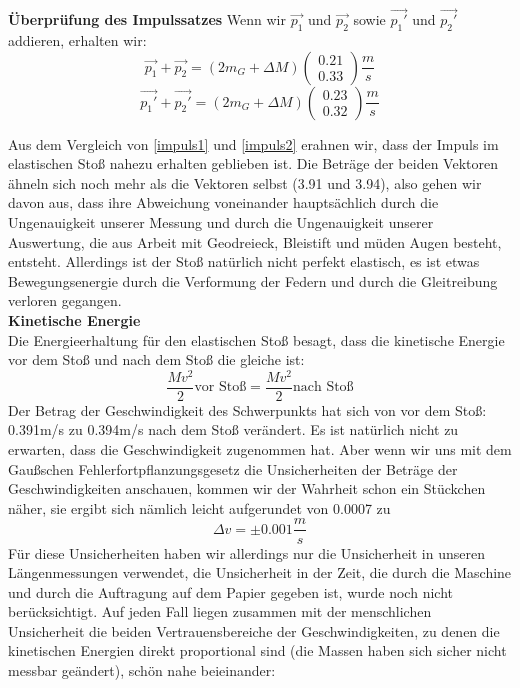 \documentclass{article}
\begin{document}
\textbf{Überprüfung des Impulssatzes}
Wenn wir $\vec{p_1}$ und $\vec{p_2}$ sowie $\vec{p_1'}$ und $\vec{p_2'}$ addieren, erhalten wir:
\begin{equation}\label{impuls1}
\vec{p_1}+\vec{p_2}=(2m_G+\Delta M )\begin{pmatrix}
0.21 \\ 0.33 
\end{pmatrix} \frac{m}{s}
\end{equation}
\begin{equation}\label{impuls2}
\vec{p_1'} + \vec{p_2'} =(2m_G +\Delta M )\begin{pmatrix}
0.23 \\
0.32
\end{pmatrix}  \frac{m}{s}
\end{equation}

Aus dem Vergleich von \ref{impuls1} und \ref{impuls2} erahnen wir, dass der Impuls im elastischen Stoß nahezu erhalten geblieben ist. Die Beträge der beiden Vektoren ähneln sich noch mehr als die Vektoren selbst (3.91 und 3.94), also gehen wir davon aus, dass ihre Abweichung voneinander hauptsächlich durch die Ungenauigkeit unserer Messung und durch die Ungenauigkeit unserer Auswertung, die aus Arbeit mit Geodreieck, Bleistift und müden Augen besteht, entsteht. Allerdings ist der Stoß natürlich nicht perfekt elastisch, es ist etwas Bewegungsenergie durch die Verformung der Federn und durch die Gleitreibung verloren gegangen. \\
\textbf{Kinetische Energie}\\
Die Energieerhaltung für den elastischen Stoß besagt, dass die kinetische Energie vor dem Stoß und nach dem Stoß die gleiche ist:
\begin{equation}
\frac{Mv^2}{2} \text{vor Stoß} = \frac{Mv^2}{2}  \text{nach Stoß} 
\end{equation}
Der Betrag der Geschwindigkeit des Schwerpunkts hat sich von vor dem Stoß: 0.391m/s zu 0.394m/s nach dem Stoß verändert. Es ist natürlich nicht zu erwarten, dass die Geschwindigkeit zugenommen hat. Aber wenn wir uns mit dem Gaußschen Fehlerfortpflanzungsgesetz die Unsicherheiten der Beträge der Geschwindigkeiten anschauen, kommen wir der Wahrheit schon ein Stückchen näher, sie ergibt sich nämlich leicht aufgerundet von 0.0007 zu 
\begin{equation}
\Delta v=\pm 0.001 \frac{m}{s}
\end{equation}
Für diese Unsicherheiten haben wir allerdings nur die Unsicherheit in unseren Längenmessungen verwendet, die Unsicherheit in der Zeit, die durch die Maschine und durch die Auftragung auf dem Papier gegeben ist, wurde noch nicht berücksichtigt. Auf jeden Fall liegen zusammen mit der menschlichen Unsicherheit die beiden Vertrauensbereiche der Geschwindigkeiten, zu denen die kinetischen Energien direkt proportional sind (die Massen haben sich sicher nicht messbar geändert), schön nahe beieinander:
\end{document}
